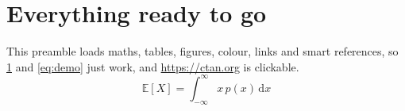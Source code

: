 \documentclass{article}
\begin{document}
\section{Everything ready to go}\label{sec:demo}
This preamble loads maths, tables, figures, colour, links and smart
references, so \cref{sec:demo} and \cref{eq:demo} just work, and
\url{https://ctan.org} is clickable.
\begin{equation}\label{eq:demo}
  \mathbb{E}[X] = \int_{-\infty}^{\infty} x \, p(x) \, \mathrm{d}x
\end{equation}
\end{document}
